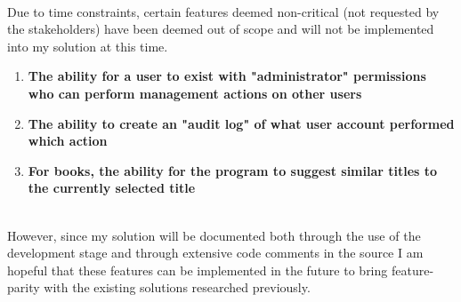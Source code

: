 \documentclass[../../../main.tex]{subfiles}
\begin{document}
\noindent \\ Due to time constraints, certain features deemed non-critical (not requested by the stakeholders)
have been deemed out of scope and will not be implemented into my solution at this time.

\begin{enumerate}
    \item \textbf{The ability for a user to exist with "administrator" permissions who can perform management actions on other users}
    \item \textbf{The ability to create an "audit log" of what user account performed which action}
    \item \textbf{For books, the ability for the program to suggest similar titles to the currently selected title}
\end{enumerate}

\noindent \\ However, since my solution will be documented both through the use of the
development stage and through extensive code comments in the source I am hopeful that these
features can be implemented in the future to bring feature-parity with the existing solutions
researched previously.
\end{document}
